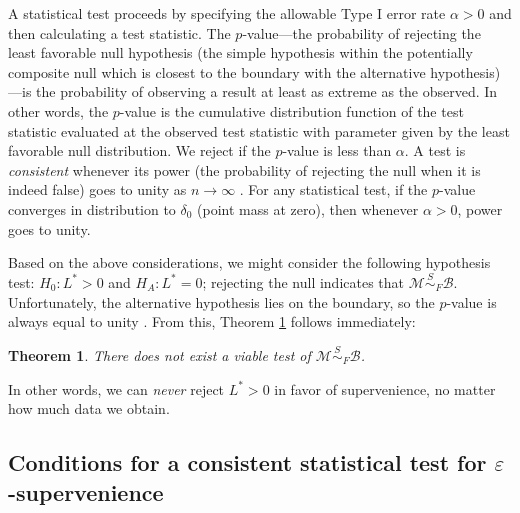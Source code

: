 \documentclass{article}
\newcommand{\conv}{\rightarrow}
\newcommand{\mB}{\mathcal{B}}
\newcommand{\mM}{\mathcal{M}}
\newcommand{\eps}{\varepsilon}
\newcommand{\MsB}{\mM \overset{S}{\sim}_{F} \mB}
\newtheorem{thm}{Theorem}
\begin{document}
A statistical test proceeds by 
specifying the allowable Type I error rate $\alpha>0$ and then
calculating a 
test statistic.
The $p$-value---the probability of rejecting the least favorable null hypothesis (the simple hypothesis within the potentially composite null which is closest to the boundary with the alternative hypothesis)---is the probability of observing a result at least as extreme as the observed.  In other words, the $p$-value is the cumulative distribution function of the test statistic evaluated at the observed test statistic with parameter given by the least favorable null distribution.
We reject if 
the $p$-value 
is less than $\alpha$.   A test is \emph{consistent} whenever its power  (the probability of rejecting the null when it is indeed false)  goes to unity as $n\conv \infty$ . For any statistical test, if the $p$-value converges in distribution to $\delta_0$ (point mass at zero), then whenever $\alpha >0$, power goes to unity. 

Based on the above considerations,
we might consider the following hypothesis test: $H_0: L^*>0$ and $H_A: L^*=0$; rejecting the null indicates that $\MsB$. Unfortunately, 
the alternative hypothesis lies on the boundary, so the $p$-value is always equal to unity \cite{Bickel2000}.  From this, Theorem \ref{thm:2} follows immediately:
\begin{thm} \label{thm:2}
	There does not exist a viable test of $\MsB$.
\end{thm}

In other words, we can \emph{never} reject $L^*>0$ in favor of supervenience, no matter how much data we obtain.  

\subsection*{Conditions for a consistent statistical test for $\eps$-supervenience} %
\end{document}
